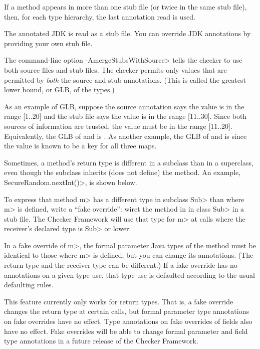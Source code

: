 If a method appears in more than one stub file (or twice in the same
stub file), then, for each type hierarchy, the last annotation read is used.

The annotated JDK is read as a stub file.
You can override JDK annotations by providing your own stub file.

The command-line option \<-AmergeStubsWithSource> tells the checker to use
both source files and stub files.  The checker permits only values that are
permitted by \emph{both} the source and stub annotations.  (This is called
the greatest lower bound, or GLB, of the types.)

As an example of GLB, suppose the source annotation says the value is in
the range [1..20] and the stub file says the value is in the range
[11..30].  Since both sources of information are trusted, the value must be
in the range [11..20].  Equivalently, the GLB of
 and
 is
.
As another example, the GLB of
 and
 is
since the value is known to be a key for all three maps.



Sometimes, a method's return type is different in a subclass than in a
superclass, even though the subclass inherits (does not define) the method.
An example, \<SecureRandom.nextInt()>, is shown below.

To express that method \<m> has a different type in subclass \<Sub> than
where \<m> is defined, write a ``fake override'':  wiret the method in in
class \<Sub> in a stub file.  The Checker Framework will use that type for
\<m> at calls where the receiver's declared type is \<Sub> or lower.

In a fake override of \<m>, the formal parameter Java types of the method
must be identical to those where \<m> is defined, but you can change its
annotations.  (The return type and the receiver type can be different.)
If a fake override has no annotations on a given type use, that type use is
defaulted according to the usual defaulting rules.

This feature currently only works for return types.  That is, a fake
override changes the return type at certain calls, but formal parameter
type annotations on fake overrides have no effect.  Type annotations on
fake overrides of fields also have no effect.  Fake overrides will be able
to change formal parameter and field type annotations in a future release
of the Checker Framework.


